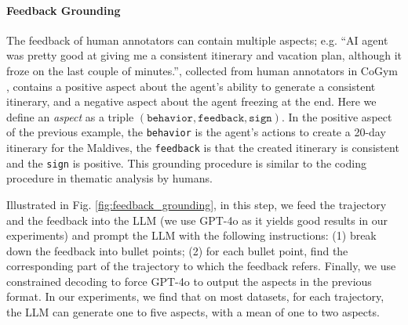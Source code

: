 \paragraph{Feedback Grounding}
The feedback of human annotators can contain multiple aspects; e.g. \textsf{``AI agent was pretty good
at giving me a consistent itinerary and vacation plan, although it froze on the last couple of minutes.''},
collected from human annotators in CoGym \citep{shao2024collaborative}, contains a positive aspect
about the agent's ability to generate a consistent itinerary, and a negative aspect about the agent freezing
at the end. Here we define an \emph{aspect} as a triple $(\texttt{behavior}, \texttt{feedback}, \texttt{sign})$.
In the positive aspect of the previous example, the \texttt{behavior} is the agent's actions to create
a 20-day itinerary for the Maldives, the \texttt{feedback} is that the created itinerary is consistent and the \texttt{sign} is positive. This grounding procedure is similar to the coding procedure in thematic analysis by humans.

Illustrated in Fig. \ref{fig:feedback_grounding}, in this step, we feed the trajectory and the feedback into the LLM (we use GPT-4o \citep{openai2024gpt4ocard} 
as it yields good results in our experiments) and prompt the LLM with the following instructions:
(1) break down the feedback into bullet points; (2) for each bullet point, find the corresponding
part of the trajectory to which the feedback refers. Finally, we use constrained decoding to force GPT-4o
to output the aspects in the previous format. In our experiments, we find that on most datasets, for each
trajectory, the LLM can generate one to five aspects, with a mean of one to two aspects.


